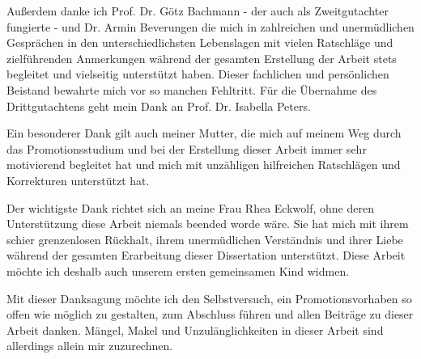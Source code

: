Außerdem danke ich Prof. Dr. Götz Bachmann - der auch als Zweitgutachter fungierte - und Dr. Armin Beverungen die mich in zahlreichen und unermüdlichen Gesprächen in den unterschiedlichsten Lebenslagen mit vielen Ratschläge und zielführenden Anmerkungen während der gesamten Erstellung der Arbeit stets begleitet und vielseitig unterstützt haben. Dieser fachlichen und persönlichen Beistand bewahrte mich vor so manchen Fehltritt. Für die Übernahme des Drittgutachtens geht mein Dank an Prof. Dr. Isabella Peters.

Ein besonderer Dank gilt auch meiner Mutter, die mich auf meinem Weg durch das Promotionsstudium und bei der Erstellung dieser Arbeit immer sehr motivierend begleitet hat und mich mit unzähligen hilfreichen Ratschlägen und Korrekturen unterstützt hat.

Der wichtigste Dank richtet sich an meine Frau Rhea Eckwolf, ohne deren Unterstützung diese Arbeit niemals beended worde wäre. Sie hat mich mit ihrem schier grenzenlosen Rückhalt, ihrem unermüdlichen Verständnis und ihrer Liebe während der gesamten Erarbeitung dieser Dissertation unterstützt. Diese Arbeit möchte ich deshalb auch unserem ersten gemeinsamen Kind widmen.

Mit dieser Danksagung möchte ich den Selbstversuch, ein Promotionsvorhaben so offen wie möglich zu gestalten, zum Abschluss führen und allen Beiträge zu dieser Arbeit danken. Mängel, Makel und Unzulänglichkeiten in dieser Arbeit sind allerdings allein mir zuzurechnen.
